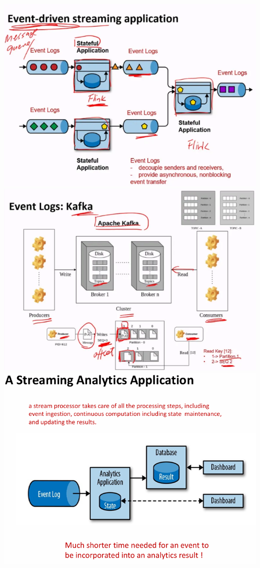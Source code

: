\documentclass[10pt, landscape]{article}
\begin{document}
\begin{multicols*}{4}
  \includegraphics[width=0.95\linewidth]{event_driven_streaming.png}
  \includegraphics[width=0.95\linewidth]{event_logs_kafka.png}
  \includegraphics[width=0.95\linewidth]{streaming_analytics_application.png}

\end{multicols*}
\end{document}

